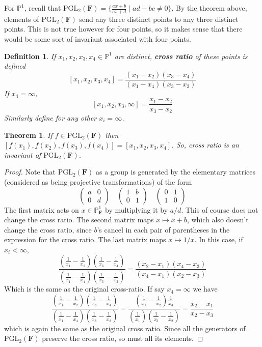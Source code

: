 \documentclass[12pt]{article}
\newcommand{\F}{\mathbf{F}}
\renewcommand{\P}{\mathbb{P}}
\newcommand{\PGL}{\mathrm{PGL}}
\newtheorem{definition}{Definition}[section]
\newtheorem{theorem}{Theorem}[section]
\begin{document}
    For $\P^1$, recall that $\PGL_2(\F) = \{\frac{ax+b}{cx+d} \mid ad - bc \neq 0\}$. By the theorem above, elements of $\PGL_2(\F)$ send any three distinct points to any three distinct points. This is not true however for four points, so it makes sense that there would be some sort of invariant associated with four points.
    \begin{definition}
        If $x_1, x_2, x_3, x_4 \in \P^1$ are distinct, \textbf{cross ratio} of these points is defined
        $$[x_1, x_2, x_3, x_4] = \frac{(x_1-x_2)(x_3-x_4)}{(x_1-x_4)(x_3-x_2)}$$
        If $x_4 = \infty$,
        $$[x_1, x_2, x_3, \infty] = \frac{x_1 - x_2}{x_3 - x_2}$$
        Similarly define for any other $x_i = \infty$.
    \end{definition}
    \begin{theorem}
        If $f \in \PGL_2(\F)$ then $[f(x_1), f(x_2), f(x_3), f(x_4)] = [x_1, x_2, x_3, x_4]$. So, cross ratio is an invariant of $\PGL_2(\F)$.
    \end{theorem}
    \begin{proof}
        Note that $\PGL_2(\F)$ as a group is generated by the elementary matrices (considered as being projective transformations) of the form
        $$\begin{pmatrix}
            a & 0 \\
            0 & d
        \end{pmatrix} \quad
        \begin{pmatrix}
            1 & b \\
            0 & 1
        \end{pmatrix} \quad
        \begin{pmatrix}
            0 & 1 \\
            1 & 0
        \end{pmatrix}$$
        The first matrix acts on $x \in \P_\F^1$ by multiplying it by $a/d$. This of course does not change the cross ratio. The second matrix maps $x \mapsto x + b$, which also doesn't change the cross ratio, since $b$'s cancel in each pair of parentheses in the expression for the cross ratio. The last matrix maps $x \mapsto 1/x$. In this case, if $x_i < \infty$,
        $$\frac{\left(\frac{1}{x_1} - \frac{1}{x_2}\right)\left(\frac{1}{x_3} - \frac{1}{x_4}\right)}{\left(\frac{1}{x_1} - \frac{1}{x_4}\right)\left(\frac{1}{x_3} - \frac{1}{x_2}\right)} = \frac{(x_2 - x_1)(x_4 - x_3)}{(x_4-x_1)(x_2-x_3)}$$
        Which is the same as the original cross-ratio. If say $x_4 = \infty$ we have
        $$\frac{\left(\frac{1}{x_1} - \frac{1}{x_2}\right)\left(\frac{1}{x_3} - \frac{1}{x_4}\right)}{\left(\frac{1}{x_1} - \frac{1}{x_4}\right)\left(\frac{1}{x_3} - \frac{1}{x_2}\right)} = \frac{\left(\frac{1}{x_1} - \frac{1}{x_2}\right)\frac{1}{x_3}}{\left(\frac{1}{x_1}\right)\left(\frac{1}{x_3} - \frac{1}{x_2}\right)} = \frac{x_2 - x_1}{x_2 - x_3}$$
        which is again the same as the original cross ratio. Since all the generators of $\PGL_2(\F)$ preserve the cross ratio, so must all its elements.
    \end{proof}
\end{document}

